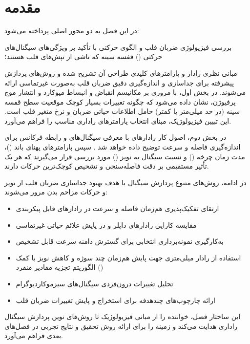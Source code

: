 
\section{مقدمه}
در این فصل به دو محور اصلی پرداخته می‌شود:

بررسی فیزیولوژی ضربان قلب و الگوی حرکتی با تأکید بر ویژگی‌های سیگنال‌های حرکتی () قفسه سینه که ناشی از تپش‌های قلب هستند؛

مبانی نظری رادار  و پارامترهای کلیدی طراحی آن تشریح شده و روش‌های پردازش پیشرفته برای جداسازی و اندازه‌گیری دقیق ضربان قلب به‌صورت غیرتماسی ارائه می‌شوند. در بخش اول، با مروری بر مکانیسم انقباض و انبساط میوکارد و انتشار موج پرفیوژن، نشان داده می‌شود که چگونه تغییرات بسیار کوچک موقعیت سطح قفسه سینه (در حد میلی‌متر یا کمتر) حامل اطلاعات حیاتی ضربان و نرخ متغیر قلب است. این تبیین فیزیولوژیک، مبنای انتخاب پارامترهای راداری مناسب را فراهم می‌آورد.

در بخش دوم، اصول کار رادارهای  با معرفی سیگنال‌های  و رابطه فرکانس  برای اندازه‌گیری فاصله و سرعت توضیح داده خواهد شد
. سپس پارامترهای پهنای باند ()، مدت زمان چرخه () و نسبت سیگنال به نویز () مورد بررسی قرار می‌گیرند که هر یک تأثیر مستقیمی بر دقت فاصله‌سنجی و تشخیص کوچک‌ترین حرکات دارند.

در ادامه، روش‌های متنوع پردازش سیگنال با هدف بهبود جداسازی ضربان قلب از نویز و حرکات مزاحم بدن مرور می‌شوند:
\begin{itemize}
  \item ارتقای تفکیک‌پذیری هم‌زمان فاصله و سرعت در رادارهای قابل پیکربندی
  \item مقایسه کارایی رادارهای داپلر و  در پایش علائم حیاتی غیرتماسی
  \item به‌کارگیری نمونه‌برداری انتخابی برای گسترش دامنه سرعت قابل تشخیص
  \item استفاده از رادار میلی‌متری جهت پایش هم‌زمان چند سوژه و کاهش نویز با کمک الگوریتم تجزیه مقادیر منفرد ()
  \item تحلیل تغییرات درون‌فردی سیگنال‌های سیزموکاردیوگرام
  \item ارائه چارچوب‌های چندهدفه برای استخراج و پایش تغییرات ضربان قلب
\end{itemize}

این ساختار فصل، خواننده را از مبانی فیزیولوژیک تا روش‌های نوین 
پردازش سیگنال راداری هدایت می‌کند و زمینه را برای ارائه روش تحقیق و نتایج تجربی در فصل‌های بعدی فراهم می‌آورد.

